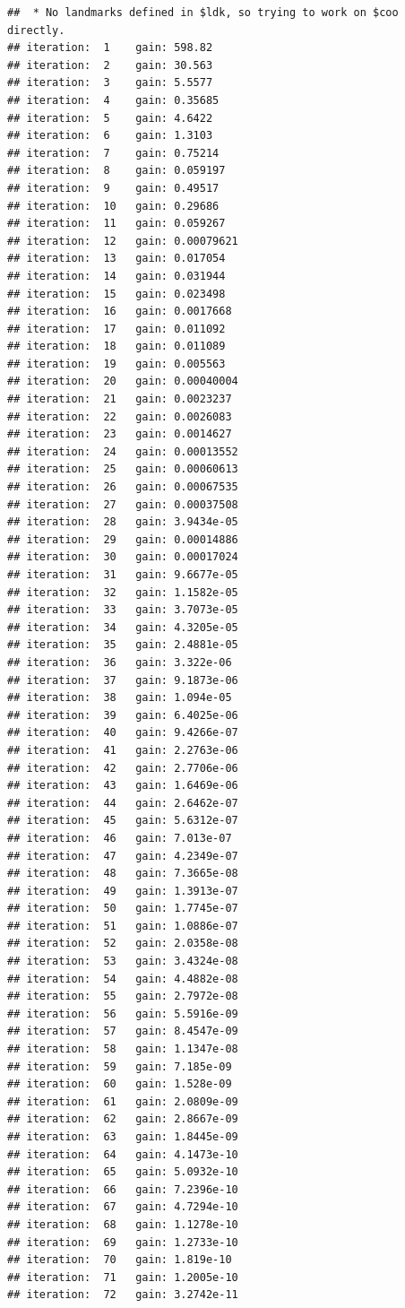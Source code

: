 \documentclass[]{article}
\begin{document}
\begin{verbatim}
##  * No landmarks defined in $ldk, so trying to work on $coo directly.
## iteration:  1    gain: 598.82 
## iteration:  2    gain: 30.563 
## iteration:  3    gain: 5.5577 
## iteration:  4    gain: 0.35685 
## iteration:  5    gain: 4.6422 
## iteration:  6    gain: 1.3103 
## iteration:  7    gain: 0.75214 
## iteration:  8    gain: 0.059197 
## iteration:  9    gain: 0.49517 
## iteration:  10   gain: 0.29686 
## iteration:  11   gain: 0.059267 
## iteration:  12   gain: 0.00079621 
## iteration:  13   gain: 0.017054 
## iteration:  14   gain: 0.031944 
## iteration:  15   gain: 0.023498 
## iteration:  16   gain: 0.0017668 
## iteration:  17   gain: 0.011092 
## iteration:  18   gain: 0.011089 
## iteration:  19   gain: 0.005563 
## iteration:  20   gain: 0.00040004 
## iteration:  21   gain: 0.0023237 
## iteration:  22   gain: 0.0026083 
## iteration:  23   gain: 0.0014627 
## iteration:  24   gain: 0.00013552 
## iteration:  25   gain: 0.00060613 
## iteration:  26   gain: 0.00067535 
## iteration:  27   gain: 0.00037508 
## iteration:  28   gain: 3.9434e-05 
## iteration:  29   gain: 0.00014886 
## iteration:  30   gain: 0.00017024 
## iteration:  31   gain: 9.6677e-05 
## iteration:  32   gain: 1.1582e-05 
## iteration:  33   gain: 3.7073e-05 
## iteration:  34   gain: 4.3205e-05 
## iteration:  35   gain: 2.4881e-05 
## iteration:  36   gain: 3.322e-06 
## iteration:  37   gain: 9.1873e-06 
## iteration:  38   gain: 1.094e-05 
## iteration:  39   gain: 6.4025e-06 
## iteration:  40   gain: 9.4266e-07 
## iteration:  41   gain: 2.2763e-06 
## iteration:  42   gain: 2.7706e-06 
## iteration:  43   gain: 1.6469e-06 
## iteration:  44   gain: 2.6462e-07 
## iteration:  45   gain: 5.6312e-07 
## iteration:  46   gain: 7.013e-07 
## iteration:  47   gain: 4.2349e-07 
## iteration:  48   gain: 7.3665e-08 
## iteration:  49   gain: 1.3913e-07 
## iteration:  50   gain: 1.7745e-07 
## iteration:  51   gain: 1.0886e-07 
## iteration:  52   gain: 2.0358e-08 
## iteration:  53   gain: 3.4324e-08 
## iteration:  54   gain: 4.4882e-08 
## iteration:  55   gain: 2.7972e-08 
## iteration:  56   gain: 5.5916e-09 
## iteration:  57   gain: 8.4547e-09 
## iteration:  58   gain: 1.1347e-08 
## iteration:  59   gain: 7.185e-09 
## iteration:  60   gain: 1.528e-09 
## iteration:  61   gain: 2.0809e-09 
## iteration:  62   gain: 2.8667e-09 
## iteration:  63   gain: 1.8445e-09 
## iteration:  64   gain: 4.1473e-10 
## iteration:  65   gain: 5.0932e-10 
## iteration:  66   gain: 7.2396e-10 
## iteration:  67   gain: 4.7294e-10 
## iteration:  68   gain: 1.1278e-10 
## iteration:  69   gain: 1.2733e-10 
## iteration:  70   gain: 1.819e-10 
## iteration:  71   gain: 1.2005e-10 
## iteration:  72   gain: 3.2742e-11
\end{verbatim}
\end{document}
